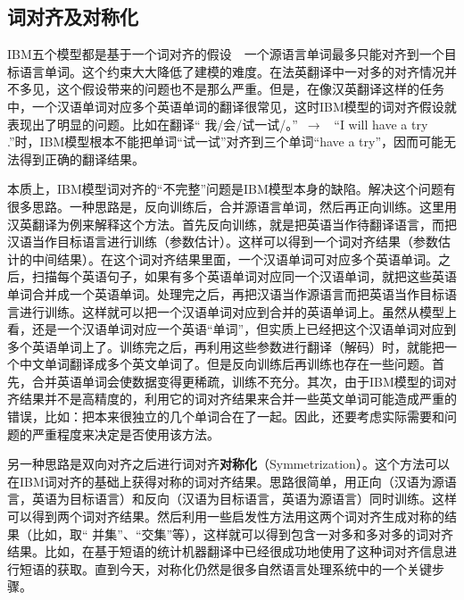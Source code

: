 
\subsection{词对齐及对称化}

\parinterval IBM五个模型都是基于一个词对齐的假设\ \dash \ 一个源语言单词最多只能对齐到一个目标语言单词。这个约束大大降低了建模的难度。在法英翻译中一对多的对齐情况并不多见，这个假设带来的问题也不是那么严重。但是，在像汉英翻译这样的任务中，一个汉语单词对应多个英语单词的翻译很常见，这时IBM模型的词对齐假设就表现出了明显的问题。比如在翻译“ 我/会/试一试/。”\ $\to$ \ “I will have a try .”时，IBM模型根本不能把单词“试一试”对齐到三个单词“have a try”，因而可能无法得到正确的翻译结果。

\parinterval 本质上，IBM模型词对齐的“不完整”问题是IBM模型本身的缺陷。解决这个问题有很多思路。一种思路是，反向训练后，合并源语言单词，然后再正向训练。这里用汉英翻译为例来解释这个方法。首先反向训练，就是把英语当作待翻译语言，而把汉语当作目标语言进行训练（参数估计）。这样可以得到一个词对齐结果（参数估计的中间结果）。在这个词对齐结果里面，一个汉语单词可对应多个英语单词。之后，扫描每个英语句子，如果有多个英语单词对应同一个汉语单词，就把这些英语单词合并成一个英语单词。处理完之后，再把汉语当作源语言而把英语当作目标语言进行训练。这样就可以把一个汉语单词对应到合并的英语单词上。虽然从模型上看，还是一个汉语单词对应一个英语“单词”，但实质上已经把这个汉语单词对应到多个英语单词上了。训练完之后，再利用这些参数进行翻译（解码）时，就能把一个中文单词翻译成多个英文单词了。但是反向训练后再训练也存在一些问题。首先，合并英语单词会使数据变得更稀疏，训练不充分。其次，由于IBM模型的词对齐结果并不是高精度的，利用它的词对齐结果来合并一些英文单词可能造成严重的错误，比如：把本来很独立的几个单词合在了一起。因此，还要考虑实际需要和问题的严重程度来决定是否使用该方法。

\parinterval 另一种思路是双向对齐之后进行词对齐{\small\sffamily\bfseries{对称化}}（Symmetrization）。这个方法可以在IBM词对齐的基础上获得对称的词对齐结果。思路很简单，用正向（汉语为源语言，英语为目标语言）和反向（汉语为目标语言，英语为源语言）同时训练。这样可以得到两个词对齐结果。然后利用一些启发性方法用这两个词对齐生成对称的结果（比如，取“ 并集”、“交集”等），这样就可以得到包含一对多和多对多的词对齐结果。比如，在基于短语的统计机器翻译中已经很成功地使用了这种词对齐信息进行短语的获取。直到今天，对称化仍然是很多自然语言处理系统中的一个关键步骤。

